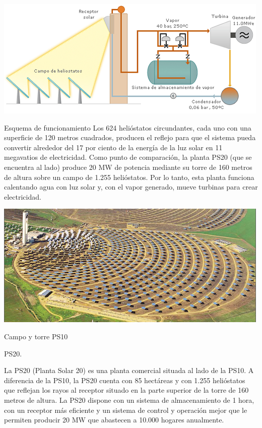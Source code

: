 \includegraphics[scale=1]{unnamed (7).jpg}

Esquema de funcionamiento
Los 624 helióstatos circundantes, cada uno con una superficie de 120 metros cuadrados, producen el reflejo para que el sistema pueda convertir alrededor del 17 por ciento de la energía de la luz solar en 11 megavatios de electricidad. Como punto de comparación, la planta PS20 (que se encuentra al lado) produce 20 MW de potencia mediante su torre de 160 metros de altura sobre un campo de 1.255 helióstatos.
Por lo tanto, esta planta funciona calentando agua con luz solar y, con el vapor generado, mueve turbinas para crear electricidad.

\includegraphics[scale=1]{unnamed (6).jpg}

Campo y torre PS10
\cite{JonathanWebSite}



PS20.

La PS20 (Planta Solar 20) es una planta comercial situada al lado de la PS10.
A diferencia de la PS10, la PS20 cuenta con 85 hectáreas y con 1.255 helióstatos que reflejan los rayos al receptor situado en la parte superior de la torre de 160 metros de altura.
La PS20 dispone con un sistema de almacenamiento de 1 hora, con un receptor más eficiente y un sistema de control y operación mejor que le permiten producir 20 MW que abastecen a 10.000 hogares anualmente.

